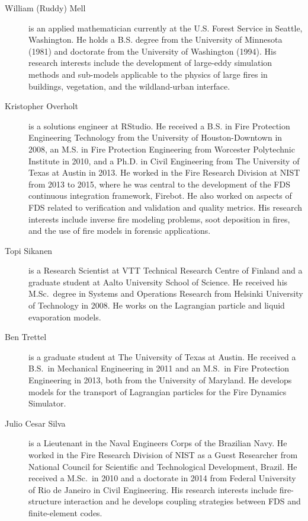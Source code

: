 \begin{description}
\item[William (Ruddy) Mell] is an applied mathematician currently at the U.S. Forest Service in Seattle, Washington. He holds a B.S. degree from the University of Minnesota (1981) and doctorate from the University of Washington (1994). His research interests include the development of large-eddy simulation methods and sub-models applicable to the physics of large fires in buildings, vegetation, and the wildland-urban interface.

\item[Kristopher Overholt] is a solutions engineer at RStudio. He received a B.S. in Fire Protection Engineering Technology from the University of Houston-Downtown in 2008, an M.S. in Fire Protection Engineering from Worcester Polytechnic Institute in 2010, and a Ph.D. in Civil Engineering from The University of Texas at Austin in 2013. He worked in the Fire Research Division at NIST from 2013 to 2015, where he was central to the development of the FDS continuous integration framework, Firebot.  He also worked on aspects of FDS related to verification and validation and quality metrics. His research interests include inverse fire modeling problems, soot deposition in fires, and the use of fire models in forensic applications.

\item[Topi Sikanen] is a Research Scientist at VTT Technical Research Centre of Finland and a graduate student at Aalto University School of Science. He received his M.Sc.~degree in Systems and Operations Research from Helsinki University of Technology in 2008. He works on the Lagrangian particle and liquid evaporation models.

\item[Ben Trettel] is a graduate student at The University of Texas at Austin. He received a B.S.~in Mechanical Engineering in 2011 and an M.S.~in Fire Protection Engineering in 2013, both from the University of Maryland. He develops models for the transport of Lagrangian particles for the Fire Dynamics Simulator.

\item[Julio Cesar Silva] is a Lieutenant in the Naval Engineers Corps of the Brazilian Navy. He worked in the Fire Research Division of NIST as a Guest Researcher from National Council for Scientific and Technological Development, Brazil. He received a M.Sc.~in 2010 and a doctorate in 2014 from Federal University of Rio de Janeiro in Civil Engineering. His research interests include fire-structure interaction and he develops coupling strategies between FDS and finite-element codes.


\end{description}
